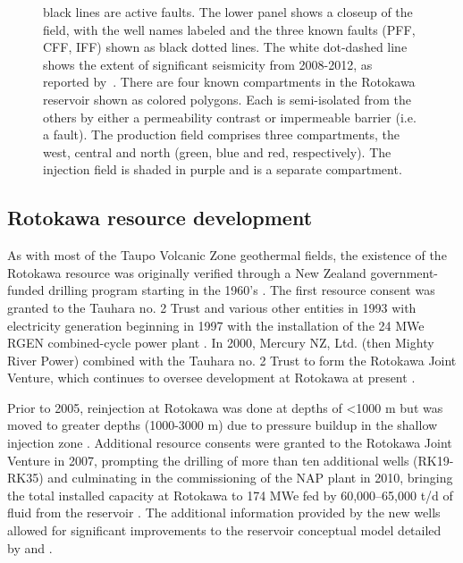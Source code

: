 \begin{figure}[p]
\begin{center}
{{black lines are active faults. The lower panel shows a closeup of the
field, with the well names labeled and the three known faults (\acrshort{PFF}, \acrshort{CFF},
\acrshort{IFF}) shown as black dotted lines. The white dot-dashed line shows the
extent of significant seismicity from 2008-2012, as reported
by~\protect\citet{Sherburn_2015}. There are four known compartments in the Rotokawa
reservoir shown as colored polygons. Each is semi-isolated from the
others by either a \gls{permeability} contrast or impermeable barrier (i.e. a
fault). The production field comprises three compartments, the west,
central and north (green, blue and red, respectively). The injection
field is shaded in purple and is a separate compartment.
{\label{518273}}%
}}
\end{center}
\end{figure}

\subsection{Rotokawa resource development}
As with most of the Taupo Volcanic Zone geothermal fields, the existence of the Rotokawa resource was originally verified through a New Zealand government-funded drilling program starting in the 1960's \citep{cole1998rotokawa}. The first resource consent was granted to the Tauhara no. 2 Trust and various other entities in 1993 with electricity generation beginning in 1997 with the installation of the 24 \acrshort{MWe} \acrfull{RGEN} combined-cycle power plant \citep{legmann200330}. In 2000, Mercury NZ, Ltd. (then Mighty River Power) combined with the Tauhara no. 2 Trust to form the Rotokawa Joint Venture, which continues to oversee development at Rotokawa at present \citep{legmann200330}.

Prior to 2005, reinjection at Rotokawa was done at depths of \textless1000 m \citep{Sewell_2015} but was moved to greater depths (1000-3000 m) due to pressure buildup in the shallow injection zone \citep{McNamara_2016}. Additional resource consents were granted to the Rotokawa Joint Venture in 2007, prompting the drilling of more than ten additional wells (RK19-RK35) and culminating in the commissioning of the \acrshort{NAP} plant in 2010, bringing the total installed capacity at Rotokawa to 174 \acrshort{MWe} fed by 60,000--65,000 t/d of fluid from the reservoir \citep{McNamara_2016}. The additional information provided by the new wells allowed for significant improvements to the reservoir conceptual model detailed by \citet{Sewell_2015} and \citet{McNamara_2016}.

